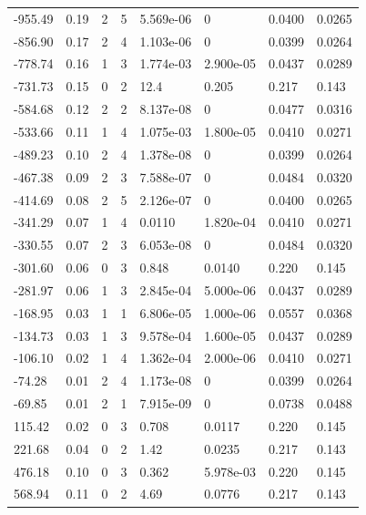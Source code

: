 \documentclass[preview]{standalone}
\begin{document}
{{\begin{tabular}{L{1.2cm}C{1.2cm} C{0.3cm}C{0.5cm} C{1.4cm}C{1.4cm} C{1.4cm}C{1.4cm}}
  -955.49  &  0.19  & 2     &  5 &  5.569e-06  & 0  & 0.0400 &  0.0265   \\ 
  -856.90  &  0.17  & 2     &  4 &  1.103e-06  & 0  & 0.0399 &  0.0264   \\ 
  -778.74  &  0.16  & 1     &  3 &  1.774e-03  & 2.900e-05  & 0.0437 &  0.0289   \\ 
  -731.73  &  0.15  & 0     &  2 &  12.4  & 0.205  & 0.217 &  0.143   \\ 
  -584.68  &  0.12  & 2     &  2 &  8.137e-08  & 0  & 0.0477 &  0.0316   \\ 
  -533.66  &  0.11  & 1     &  4 &  1.075e-03  & 1.800e-05  & 0.0410 &  0.0271   \\ 
  -489.23  &  0.10  & 2     &  4 &  1.378e-08  & 0  & 0.0399 &  0.0264   \\ 
  -467.38  &  0.09  & 2     &  3 &  7.588e-07  & 0  & 0.0484 &  0.0320   \\ 
  -414.69  &  0.08  & 2     &  5 &  2.126e-07  & 0  & 0.0400 &  0.0265   \\ 
  -341.29  &  0.07  & 1     &  4 &  0.0110  & 1.820e-04  & 0.0410 &  0.0271   \\ 
  -330.55  &  0.07  & 2     &  3 &  6.053e-08  & 0  & 0.0484 &  0.0320   \\ 
  -301.60  &  0.06  & 0     &  3 &  0.848  & 0.0140  & 0.220 &  0.145   \\ 
  -281.97  &  0.06  & 1     &  3 &  2.845e-04  & 5.000e-06  & 0.0437 &  0.0289   \\ 
  -168.95  &  0.03  & 1     &  1 &  6.806e-05  & 1.000e-06  & 0.0557 &  0.0368   \\ 
  -134.73  &  0.03  & 1     &  3 &  9.578e-04  & 1.600e-05  & 0.0437 &  0.0289   \\ 
  -106.10  &  0.02  & 1     &  4 &  1.362e-04  & 2.000e-06  & 0.0410 &  0.0271   \\ 
  -74.28  &  0.01  & 2     &  4 &  1.173e-08  & 0  & 0.0399 &  0.0264   \\ 
  -69.85  &  0.01  & 2     &  1 &  7.915e-09  & 0  & 0.0738 &  0.0488   \\ 
  115.42  &  0.02  & 0     &  3 &  0.708  & 0.0117  & 0.220 &  0.145   \\ 
  221.68  &  0.04  & 0     &  2 &  1.42  & 0.0235  & 0.217 &  0.143   \\ 
  476.18  &  0.10  & 0     &  3 &  0.362  & 5.978e-03  & 0.220 &  0.145   \\ 
  568.94  &  0.11  & 0     &  2 &  4.69  & 0.0776  & 0.217 &  0.143   \\ 

\end{tabular}}}
\end{document}

